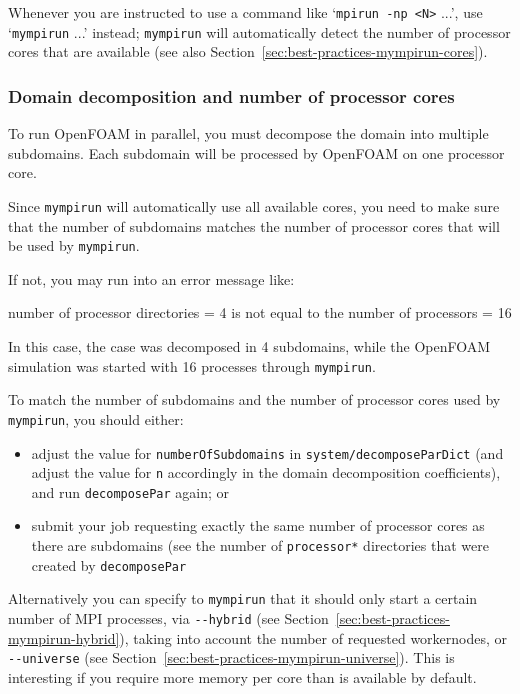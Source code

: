 Whenever you are instructed to use a command like `\texttt{\small{mpirun -np <N>}} ...',
use `\texttt{\small{mympirun}} ...' instead; \texttt{\small{mympirun}} will automatically detect the number of
processor cores that are available (see also Section~\ref{sec:best-practices-mympirun-cores}).


\subsubsection{Domain decomposition and number of processor cores}
\label{sec:best-practices-openfoam-domain-decomposition-processor-cores}

To run OpenFOAM in parallel, you must decompose the domain into multiple subdomains.
Each subdomain will be processed by OpenFOAM on one processor core.

Since {\small\texttt{mympirun}} will automatically use all available cores, you need to make sure
that the number of subdomains matches the number of processor cores that will be used by {\small\texttt{mympirun}}.

If not, you may run into an error message like:

\begin{prompt}
number of processor directories = 4 is not equal to the number of processors = 16
\end{prompt}

In this case, the case was decomposed in 4 subdomains, while the OpenFOAM simulation was started with 16 processes
through {\small\texttt{mympirun}}.

To match the number of subdomains and the number of processor cores used by {\small\texttt{mympirun}}, 
you should either:

\begin{itemize}
\item adjust the value for {\small\texttt{numberOfSubdomains}} in {\small\texttt{system/decomposeParDict}}
(and adjust the value for {\small\texttt{n}} accordingly in the domain decomposition coefficients),
and run {\small\texttt{decomposePar}} again; or
\item submit your job requesting exactly the same number of processor cores as there are subdomains (see the
number of {\small\texttt{processor*}} directories that were created by {\small\texttt{decomposePar}}
\end{itemize}

Alternatively you can specify to \texttt{mympirun} that it should only start a certain number of MPI processes,
via {\small\texttt{-{}-hybrid}} (see Section~\ref{sec:best-practices-mympirun-hybrid}),
taking into account the number of requested workernodes,
or {\small\texttt{-{}-universe}} (see Section~\ref{sec:best-practices-mympirun-universe}).
This is interesting if you require more memory per core than is available by default.

